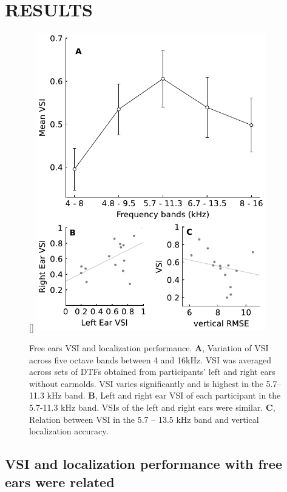 \section{RESULTS}\label{sec3}%
\begin{figure}
\captionsetup{width=10cm}
\centering
    \raisebox{0pt}[\dimexpr{}\baselineskip\relax]{
        \includegraphics[width=10cm]{../Results/figures/fig2/fig2}}
	\caption{Free ears VSI and localization performance. \textbf{A}, Variation of VSI across five octave bands between 4 and 16kHz. VSI was averaged across sets of DTFs obtained from participants' left and right ears without earmolds. VSI varies significantly and is highest in the 5.7–11.3 kHz band.  \textbf{B}, Left and right ear VSI of each participant in the 5.7-11.3 kHz band. VSIs of the left and right ears were similar. \textbf{C}, Relation between VSI in the 5.7 – 13.5 kHz band and vertical localization accuracy.}
	\label{fig:ef_vsi}
\end{figure}
\noindent\vspace{-2.1\baselineskip}

\subsection{VSI and localization performance with free ears were related}

